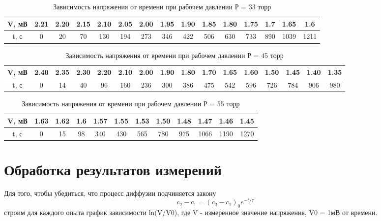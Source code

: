 \documentclass[a4paper,12pt]{article}
\begin{document}
\begin{table}[H]
	\centering
	\begin{tabular}{|c|c|c|c|c|c|c|c|c|c|c|c|c|c|c|}
		\hline

		V, мВ & 2.21& 2.20& 2.15& 2.10& 2.05& 2.00& 1.95& 1.90& 1.85& 1.80& 1.75& 1.7& 1.65& 1.6\\ \hline
		t, с &0& 20& 70& 130& 194& 273& 346& 422& 506& 630& 733& 890& 1039& 1211 \\ \hline
	
	\end{tabular}
	\caption{Зависимость напряжения от времени при рабочем давлении Р = 33 торр}
	\label{tab:approx}
\end{table}

\begin{table}[H]
	\centering
	\begin{tabular}{|c|c|c|c|c|c|c|c|c|c|c|c|c|c|c|c|}
		\hline

		V, мВ & 2.40& 2.35& 2.30& 2.20& 2.10& 2.00& 1.90&1.80& 1.70& 1.65& 1.60& 1.50& 1.45& 1.40& 1.35\\ \hline
		t, с & 0& 14& 40& 96& 160& 236& 300& 386& 475& 542& 596& 726& 784& 906& 980\\ \hline
	
	\end{tabular}
	\caption{Зависимость напряжения от времени при рабочем давлении Р = 45 торр}
	\label{tab:approx}
\end{table}

\begin{table}[H]
	\centering
	\begin{tabular}{|c|c|c|c|c|c|c|c|c|c|c|c|}
		\hline

		V, мВ & 1.63& 1.62& 1.6& 1.57& 1.55& 1.53& 1.50& 1.48& 1.47& 1.46& 1.45\\ \hline
		t, с & 0& 15& 98& 340& 430& 565& 780& 975& 1066& 1190& 1270\\ \hline
	
	\end{tabular}
	\caption{Зависимость напряжения от времени при рабочем давлении Р = 55 торр}
	\label{tab:approx}
\end{table}


\section{Обработка результатов измерений}

Для того, чтобы убедиться, что процесс диффузии подчиняется закону
\[c_2 - c_1 = (c_2 - c_1)_{0} e^{-t/\tau } \]
строим для каждого опыта график зависимости ln(V/V0), где V - измеренное значение напряжения, V0 = 1мВ от времени. 
\end{document}
